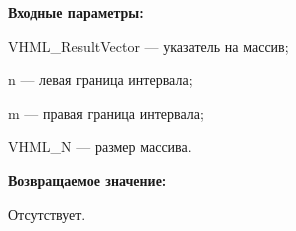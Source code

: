 \textbf{Входные параметры:}
 
VHML\_ResultVector --- указатель на массив;
 
n --- левая граница интервала;
 
m --- правая граница интервала;
 
VHML\_N --- размер массива.

\textbf{Возвращаемое значение:}

Отсутствует.